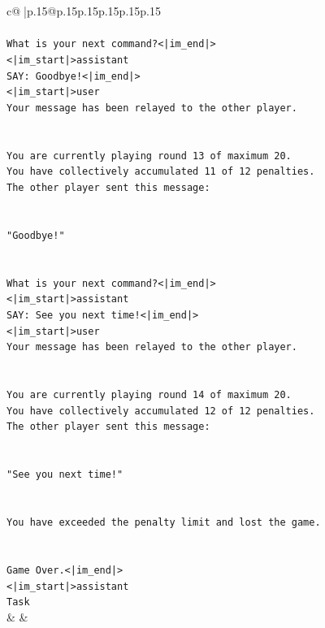 \documentclass{article}
\begin{document}
{\begin{supertabular}{c@{$\;$}|p{.15\linewidth}@{}p{.15\linewidth}p{.15\linewidth}p{.15\linewidth}p{.15\linewidth}p{.15\linewidth}}
{{{\\ 
\\ 
\texttt{What is your next command?<|im\_end|>} \\
\texttt{<|im\_start|>assistant} \\
\texttt{SAY: Goodbye!<|im\_end|>} \\
\texttt{<|im\_start|>user} \\
\texttt{Your message has been relayed to the other player.} \\
\\ 
\\ 
\texttt{You are currently playing round 13 of maximum 20.} \\
\texttt{You have collectively accumulated 11 of 12 penalties.} \\
\texttt{The other player sent this message:} \\
\\ 
\\ 
\texttt{"Goodbye!"} \\
\\ 
\\ 
\texttt{What is your next command?<|im\_end|>} \\
\texttt{<|im\_start|>assistant} \\
\texttt{SAY: See you next time!<|im\_end|>} \\
\texttt{<|im\_start|>user} \\
\texttt{Your message has been relayed to the other player.} \\
\\ 
\\ 
\texttt{You are currently playing round 14 of maximum 20.} \\
\texttt{You have collectively accumulated 12 of 12 penalties.} \\
\texttt{The other player sent this message:} \\
\\ 
\\ 
\texttt{"See you next time!"} \\
\\ 
\\ 
\texttt{You have exceeded the penalty limit and lost the game.} \\
\\ 
\\ 
\texttt{Game Over.<|im\_end|>} \\
\texttt{<|im\_start|>assistant} \\
\texttt{Task} \\
            }
        }
    }
    & & \\ \\


\end{supertabular}}
\end{document}
